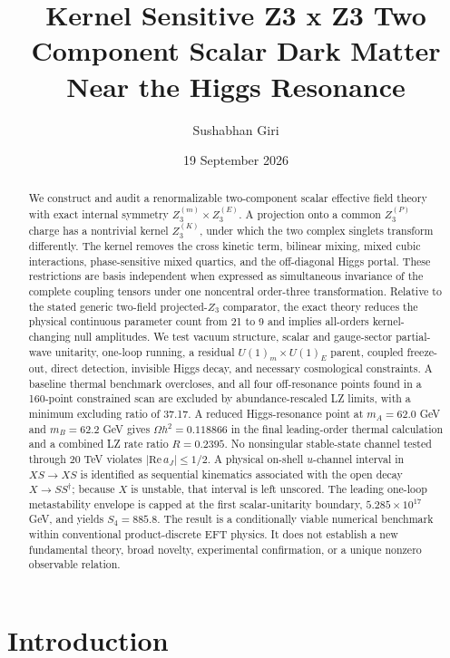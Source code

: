 \documentclass[
]{article}
\title{Kernel Sensitive Z3 x Z3 Two Component Scalar Dark Matter Near
the Higgs Resonance}
\author{Sushabhan Giri}
\date{19 September 2026}
\begin{document}
\maketitle
\begin{abstract}
We construct and audit a renormalizable two-component scalar effective
field theory with exact internal symmetry \(Z_3^{(m)}\times Z_3^{(E)}\).
A projection onto a common \(Z_3^{(P)}\) charge has a nontrivial kernel
\(Z_3^{(K)}\), under which the two complex singlets transform
differently. The kernel removes the cross kinetic term, bilinear mixing,
mixed cubic interactions, phase-sensitive mixed quartics, and the
off-diagonal Higgs portal. These restrictions are basis independent when
expressed as simultaneous invariance of the complete coupling tensors
under one noncentral order-three transformation. Relative to the stated
generic two-field projected-\(Z_3\) comparator, the exact theory reduces
the physical continuous parameter count from 21 to 9 and implies
all-orders kernel-changing null amplitudes. We test vacuum structure,
scalar and gauge-sector partial-wave unitarity, one-loop running, a
residual \(U(1)_m\times U(1)_E\) parent, coupled freeze-out, direct
detection, invisible Higgs decay, and necessary cosmological
constraints. A baseline thermal benchmark overcloses, and all four
off-resonance points found in a 160-point constrained scan are excluded
by abundance-rescaled LZ limits, with a minimum excluding ratio of
37.17. A reduced Higgs-resonance point at \(m_A=62.0\) GeV and
\(m_B=62.2\) GeV gives \(\Omega h^2=0.118866\) in the final
leading-order thermal calculation and a combined LZ rate ratio
\(R=0.2395\). No nonsingular stable-state channel tested through 20 TeV
violates \(|\mathrm{Re}\,a_J|\leq 1/2\). A physical on-shell
\(u\)-channel interval in \(XS\to XS\) is identified as sequential
kinematics associated with the open decay \(X\to SS^\dagger\); because
\(X\) is unstable, that interval is left unscored. The leading one-loop
metastability envelope is capped at the first scalar-unitarity boundary,
\(5.285\times10^{17}\) GeV, and yields \(S_4=885.8\). The result is a
conditionally viable numerical benchmark within conventional
product-discrete EFT physics. It does not establish a new fundamental
theory, broad novelty, experimental confirmation, or a unique nonzero
observable relation.
\end{abstract}

{
\setcounter{tocdepth}{3}
\tableofcontents
}
\hypertarget{introduction}{%
\section{Introduction}\label{introduction}}
\end{document}
